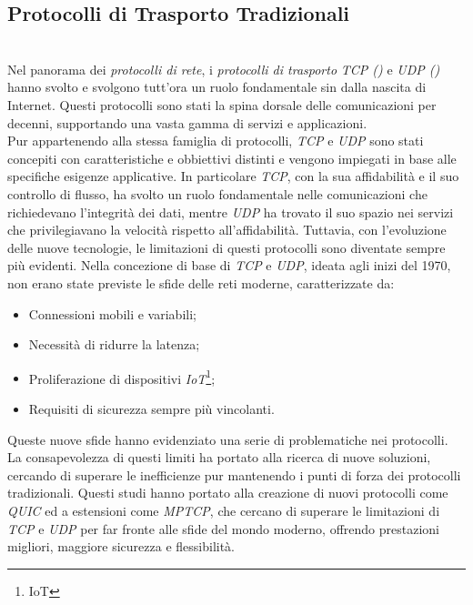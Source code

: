 \subsection{Protocolli di Trasporto Tradizionali}
~\\
\indent Nel panorama dei \emph{protocolli di rete}, i \emph{protocolli di trasporto} \emph{TCP ()} e \emph{UDP ()} hanno svolto e svolgono tutt'ora un ruolo fondamentale sin dalla nascita di Internet.
Questi protocolli sono stati la spina dorsale delle comunicazioni per decenni, supportando una vasta gamma di servizi e applicazioni.\\
Pur appartenendo alla stessa famiglia di protocolli, \emph{TCP} e \emph{UDP} sono stati concepiti con caratteristiche e obbiettivi distinti e vengono impiegati in base alle specifiche esigenze applicative.
In particolare \emph{TCP}, con la sua affidabilità e il suo controllo di flusso, ha svolto un ruolo fondamentale nelle comunicazioni che richiedevano l'integrità dei dati, mentre \emph{UDP} ha trovato il suo spazio nei servizi che privilegiavano la velocità rispetto all'affidabilità. 
Tuttavia, con l'evoluzione delle nuove tecnologie, le limitazioni di questi protocolli sono diventate sempre più evidenti. Nella concezione di base di \emph{TCP} e \emph{UDP}, ideata agli inizi del 1970, non erano state previste le sfide delle reti moderne, 
caratterizzate da:  
\begin{itemize}
    \item Connessioni mobili e variabili;
    
    \item Necessità di ridurre la latenza;
    
    \item Proliferazione di dispositivi \emph{IoT}\footnote{\gls{IoT}};
     
    \item Requisiti di sicurezza sempre più vincolanti.
\end{itemize}

\noindent Queste nuove sfide hanno evidenziato una serie di problematiche nei protocolli. La consapevolezza di questi limiti ha portato alla ricerca di nuove soluzioni, cercando di superare le inefficienze pur mantenendo i punti di forza dei protocolli tradizionali.
Questi studi hanno portato alla creazione di nuovi protocolli come \emph{QUIC} ed a estensioni come \emph{MPTCP}, che cercano di superare le limitazioni di \emph{TCP} e \emph{UDP} per far fronte alle sfide del mondo moderno, offrendo prestazioni migliori, maggiore sicurezza e flessibilità.
